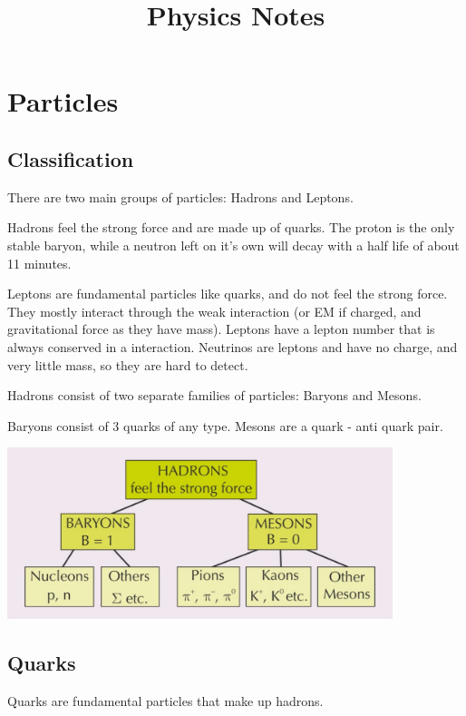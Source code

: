 \documentclass[a4paper, 12pt]{article}
\title{Physics Notes}
\date{}
\begin{document}
\maketitle
\tableofcontents
\newpage

\section{Particles}

\subsection{Classification}

There are two main groups of particles: Hadrons and Leptons.

Hadrons feel the strong force and are made up of quarks. The proton is the only stable baryon, while a neutron left on it's own will decay with a half life of about 11 minutes.

Leptons are fundamental particles like quarks, and do not feel the strong force. They mostly interact through the weak interaction (or EM if charged, and gravitational force as they have mass).
Leptons have a lepton number that is always conserved in a interaction. Neutrinos are leptons and have no charge, and very little mass, so they are hard to detect.

Hadrons consist of two separate families of particles: Baryons and Mesons.

Baryons consist of 3 quarks of any type. Mesons are a quark - anti quark pair.

\begin{center}
\includegraphics[height=5cm]{images/hadronFamily.png}
\end{center}

\subsection{Quarks}

Quarks are fundamental particles that make up hadrons.
\end{document}
